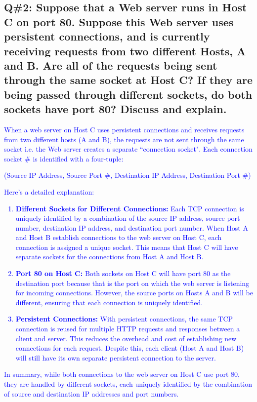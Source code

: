 \subsection{Q\#2: Suppose that a Web server runs in Host C on port 80. Suppose this Web server uses persistent connections, and is currently receiving requests from two different Hosts, A and B. Are all of the requests being sent through the same socket at Host C? If they are being passed through different sockets, do both sockets have port 80? Discuss and explain.}
\textcolor{blue}{
When a web server on Host C uses persistent connections and receives requests from two different hosts (A and B), the requests are not sent through the same socket i.e. the Web server creates a separate ``connection socket". Each connection socket \# is identified with a four-tuple:
\begin{center}
(Source IP Address, Source Port \#, Destination IP Address, Destination Port \#)
\end{center}
Here's a detailed explanation:
\begin{enumerate}
    \item \textbf{Different Sockets for Different Connections:} Each TCP connection is uniquely identified by a combination of the source IP address, source port number, destination IP address, and destination port number. When Host A and Host B establish connections to the web server on Host C, each connection is assigned a unique socket. This means that Host C will have separate sockets for the connections from Host A and Host B.
    \item \textbf{Port 80 on Host C:} Both sockets on Host C will have port 80 as the destination port because that is the port on which the web server is listening for incoming connections. However, the source ports on Hosts A and B will be different, ensuring that each connection is uniquely identified.
    \item \textbf{Persistent Connections:} With persistent connections, the same TCP connection is reused for multiple HTTP requests and responses between a client and server. This reduces the overhead and cost of establishing new connections for each request. Despite this, each client (Host A and Host B) will still have its own separate persistent connection to the server.
\end{enumerate}
In summary, while both connections to the web server on Host C use port 80, they are handled by different sockets, each uniquely identified by the combination of source and destination IP addresses and port numbers.
}
